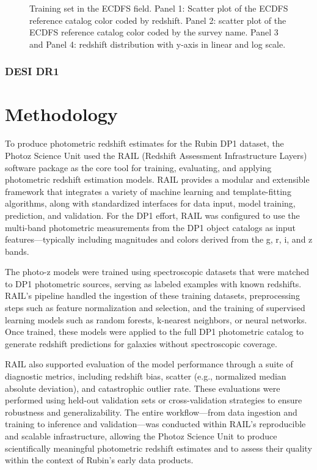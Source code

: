 \begin{figure*}
    \centering
    \caption{Training set in the ECDFS field. Panel 1: Scatter plot of the ECDFS reference catalog color coded by redshift. Panel 2: scatter plot of the ECDFS reference catalog color coded by the survey name. Panel 3 and Panel 4: redshift distribution with y-axis in linear and log scale. }
    \label{fig:enter-label}
\end{figure*}

\subsubsection{DESI DR1}
\label{sec:data:desi}


\section{Methodology}
\label{sec:method:0}

To produce photometric redshift estimates for the Rubin DP1 dataset, the Photoz Science Unit used the RAIL (Redshift Assessment Infrastructure Layers) software package as the core tool for training, evaluating, and applying photometric redshift estimation models. RAIL provides a modular and extensible framework that integrates a variety of machine learning and template-fitting algorithms, along with standardized interfaces for data input, model training, prediction, and validation. For the DP1 effort, RAIL was configured to use the multi-band photometric measurements from the DP1 object catalogs as input features—typically including magnitudes and colors derived from the g, r, i, and z bands.

The photo-z models were trained using spectroscopic datasets that were matched to DP1 photometric sources, serving as labeled examples with known redshifts. RAIL's pipeline handled the ingestion of these training datasets, preprocessing steps such as feature normalization and selection, and the training of supervised learning models such as random forests, k-nearest neighbors, or neural networks. Once trained, these models were applied to the full DP1 photometric catalog to generate redshift predictions for galaxies without spectroscopic coverage.

RAIL also supported evaluation of the model performance through a suite of diagnostic metrics, including redshift bias, scatter (e.g., normalized median absolute deviation), and catastrophic outlier rate. These evaluations were performed using held-out validation sets or cross-validation strategies to ensure robustness and generalizability. The entire workflow—from data ingestion and training to inference and validation—was conducted within RAIL’s reproducible and scalable infrastructure, allowing the Photoz Science Unit to produce scientifically meaningful photometric redshift estimates and to assess their quality within the context of Rubin’s early data products.

